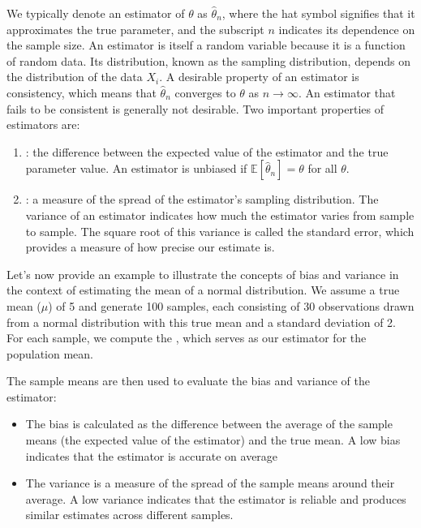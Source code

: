 \documentclass[letterpaper,10pt,english]{jupyterBook}
\begin{document}
\sphinxAtStartPar
We typically denote an estimator of \(\theta\) as \(\widehat{\theta}_n\), where the hat symbol signifies that it approximates the true parameter, and the subscript \(n\) indicates its dependence on the sample size. An estimator is itself a random variable because it is a function of random data. Its distribution, known as the sampling distribution, depends on the distribution of the data \(X_i\). A desirable property of an estimator is consistency, which means that \(\hat{\theta}_n\) converges to \(\theta\) as \(n \rightarrow \infty\). An estimator that fails to be consistent is generally not desirable. Two important properties of estimators are:
\begin{enumerate}
%
\item {} 
\sphinxAtStartPar
{}: the difference between the expected value of the estimator and the true parameter value. An estimator is unbiased if \(\mathbb{E}[\widehat{\theta}_n] = \theta\) for all \(\theta\).

\item {} 
\sphinxAtStartPar
{}: a measure of the spread of the estimator’s sampling distribution. The variance of an estimator indicates how much the estimator varies from sample to sample. The square root of this variance is called the standard error, which provides a measure of how precise our estimate is.

\end{enumerate}

\sphinxAtStartPar
Let’s now provide an example to illustrate the concepts of bias and variance in the context of estimating the mean of a normal distribution. We assume a true mean (\(\mu\)) of 5 and generate 100 samples, each consisting of 30 observations drawn from a normal distribution with this true mean and a standard deviation of 2. For each sample, we compute the , which serves as our estimator for the population mean.

\sphinxAtStartPar
The sample means are then used to evaluate the bias and variance of the estimator:
\begin{itemize}
\item {} 
\sphinxAtStartPar
The bias is calculated as the difference between the average of the sample means (the expected value of the estimator) and the true mean. A low bias indicates that the estimator is accurate on average

\item {} 
\sphinxAtStartPar
The variance is a measure of the spread of the sample means around their average. A low variance indicates that the estimator is reliable and produces similar estimates across different samples.

\end{itemize}
\end{document}
